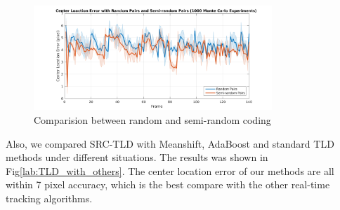 \begin{figure}[!th]
	\centering
	\includegraphics[width=0.8\textwidth]{Figs/chp04_24_random_semi_random_monte_carlo.pdf}
	\caption{Comparision between random and semi-random coding}
	\label{fig:chp04_24_random_semi_random_monte_carlo}    
\end{figure}

Also, we compared SRC-TLD with Meanshift, AdaBoost and standard TLD methods under different situations. The results was shown in Fig\ref{lab:TLD_with_others}. The center location error of our methods are all within 7 pixel accuracy, which is the best compare with the other real-time tracking algorithms.
